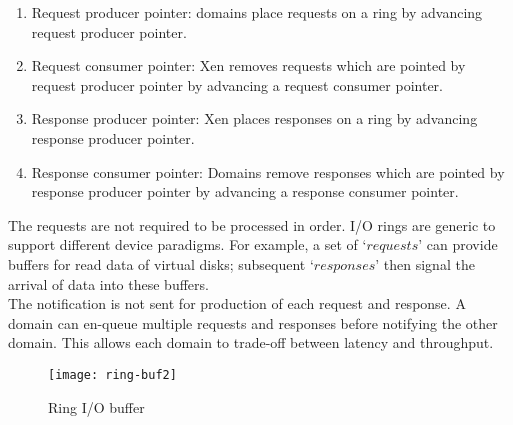 \begin{enumerate}
\item Request producer pointer: domains place requests on a ring by advancing request producer pointer. 
\item Request consumer pointer: Xen removes requests which are pointed by request producer pointer by advancing a request consumer pointer. 
\item Response producer pointer: Xen places responses on a ring by advancing response producer pointer. 
\item Response consumer pointer: Domains remove responses which are pointed by response producer pointer by advancing a response consumer pointer. 
\end{enumerate} 

The requests are not required to be processed in order. I/O rings are generic to support different device paradigms. For example, a set of $‘requests’$ can provide buffers for read data of virtual disks; subsequent $‘responses’$ then signal the arrival of data into these buffers. 
\\
The notification is not sent for production of each request and response. A domain can en-queue multiple requests and responses before notifying the other domain. This allows each domain to trade-off between latency and throughput.

\begin{figure}[!ht]
\centering
\texttt{[image: ring-buf2]}
\caption{Ring I/O buffer}
\label{fig:Ring buffer}
\end{figure}
\pagebreak


